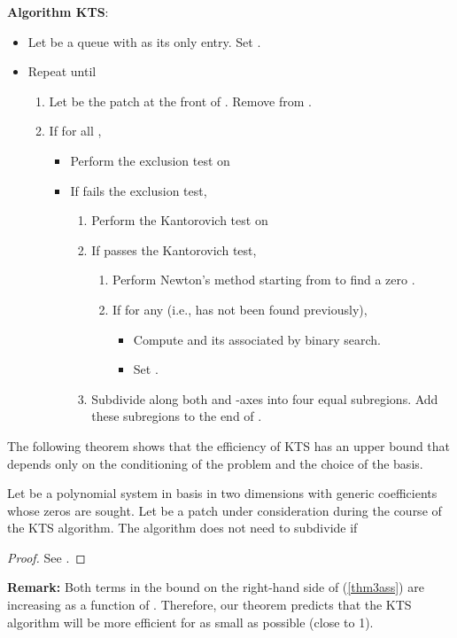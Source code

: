 \documentclass[12pt]{article}
\begin{document}
\begin{flushleft}
\textbf{Algorithm KTS}:
\end{flushleft}
\begin{itemize}
\item Let  be a queue with  as its only entry. Set .
\item Repeat until 
\begin{enumerate}
\item Let  be the patch at the front of .  Remove  from .
\item If  for all ,
\begin{itemize}
\item Perform the exclusion test on 
\item If  fails the exclusion test,
\begin{enumerate}
\item Perform the Kantorovich test on 
\item If  passes the Kantorovich test,
\begin{enumerate}
\item Perform Newton's method starting from  to find a zero .
\item If  for any  (i.e.,  has not been found previously),
\begin{itemize}
\item Compute  and its associated  by binary search.
\item Set .
\end{itemize}
\end{enumerate}
\item Subdivide  along both  and -axes into four equal subregions. Add these subregions
to the end of .
\end{enumerate}
\end{itemize}
\end{enumerate}
\end{itemize}

The following theorem shows that the efficiency of KTS has an upper bound
that depends only on the conditioning of the problem and the choice of
the basis.
\begin{thm}
\label{thm3} Let  be a polynomial system in basis
 in two dimensions with generic coefficients
whose zeros are sought.  Let  be a patch under
consideration during the course of the KTS algorithm. The
algorithm does not need to subdivide  if

\begin{proof} See \cite{srijuntongsiri_lsi}.
\end{proof}
\end{thm}
\begin{flushleft}
\textbf{Remark:} Both terms in the bound on the right-hand side of (\ref{thm3ass}) are
increasing as a function of .
Therefore, our theorem predicts that the KTS algorithm will be more efficient
for  as small as possible (close to 1).
\end{flushleft}
\end{document}
